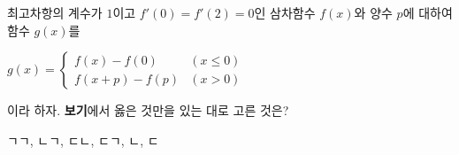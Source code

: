 최고차항의 계수가 $1$이고 $f'(0)=f'(2)=0$인 삼차함수 $f(x)$와 양수 $p$에 대하여 함수 $g(x)$를 \par\smallskip\noindent\hspace*{1.5em}$g(x)=\begin{cases} f(x)-f(0) & (x\le 0) \\ f(x+p)-f(p) & (x>0) \end{cases}$\par\smallskip\noindent 이라 하자. \textbf{보기}에서 옳은 것만을 있는 대로 고른 것은? 
\begin{choices32}{ㄱ}{ㄱ, ㄴ}{ㄱ, ㄷ}{ㄴ, ㄷ}{ㄱ, ㄴ, ㄷ}\end{choices32}
